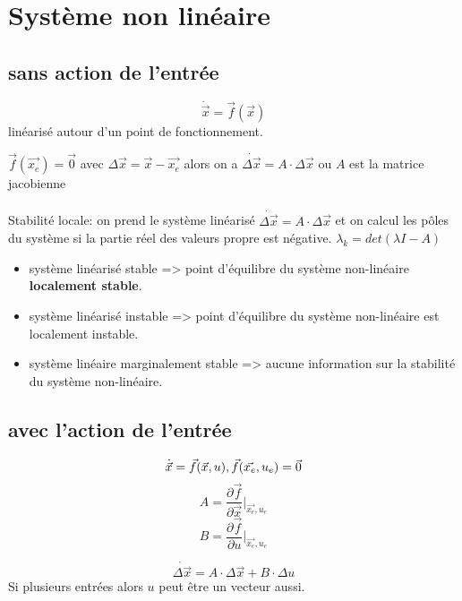 \documentclass[resume]{subfiles}
\begin{document}
\section{Système non linéaire}

\subsection{sans action de l'entrée}
$$\dot{\vec{x}} = \vec{f}(\vec{x})$$ linéarisé autour d'un point de fonctionnement.

$\vec{f}(\vec{x_e})= \vec{0}$ avec $\Delta\vec{x} = \vec{x}-\vec{x_e}$ alors on a $\dot{\Delta\vec{x}} = A \cdot\Delta\vec{x}$ ou $A$ est la matrice jacobienne

\paragraph{}
Stabilité locale: on prend le système linéarisé  $\dot{\Delta\vec{x}} = A \cdot\Delta\vec{x}$ et on calcul les pôles du système si la partie réel des valeurs propre est négative. $\lambda_k = det(\lambda I-A)$ 

\begin{itemize}
\item système linéarisé stable => point d'équilibre du système non-linéaire \textbf{localement stable}.
\item système linéarisé instable => point d'équilibre du système non-linéaire est localement instable.
\item système linéaire marginalement stable => aucune information sur la stabilité du système non-linéaire.
\end{itemize}

\subsection{avec l'action de l'entrée}
$$\dot{\vec{x}} = \vec{f}(\vec{x}, u),\space \vec{f}(\vec{x_e},u_e)=\vec{0}$$
$$A = \frac{\partial\vec{f}}{\partial\vec{x}}\big|_{\vec{x_e},u_e}$$
$$B = \frac{\partial\vec{f}}{\partial u}\big|_{\vec{x_e},u_e}$$

$$\dot{\Delta\vec{x}} = A \cdot\Delta\vec{x}+ B\cdot\Delta u$$
Si plusieurs entrées alors $u$ peut être un vecteur aussi.
\end{document}
